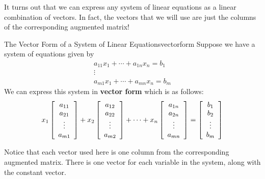 It turns out that we can express any system of linear equations as a linear combination of vectors. In fact,
the vectors that we will use are just the columns of the corresponding augmented matrix! 

\begin{definition}{The Vector Form of a System of Linear Equations}{vectorform}
Suppose we have a system of equations given by
\begin{equation*}
\begin{array}{c}
a_{11}x_{1}+\cdots +a_{1n}x_{n}=b_{1} \\
\vdots \\
a_{m1}x_{1}+\cdots +a_{mn}x_{n}=b_{m}
\end{array}
\end{equation*}
We can express this system in \textbf{vector form} which is as follows:
\begin{equation*}
x_1
\left[
\begin{array}{c}
a_{11}\\
a_{21}\\
\vdots \\
a_{m1}
\end{array}
\right]
+
x_2
\left[
\begin{array}{c}
a_{12}\\
a_{22}\\
\vdots \\
a_{m2}
\end{array}
\right]
+
\cdots
+
x_n
\left[
\begin{array}{c}
a_{1n}\\
a_{2n}\\
\vdots \\
a_{mn}
\end{array}
\right]
=
\left[
\begin{array}{c}
b_1\\
b_2\\
\vdots \\
b_m
\end{array}
\right]
\end{equation*}
\end{definition}

Notice that each vector used here is one column from the corresponding augmented  matrix. There is one vector for each variable in the system,
along with the constant vector. 

